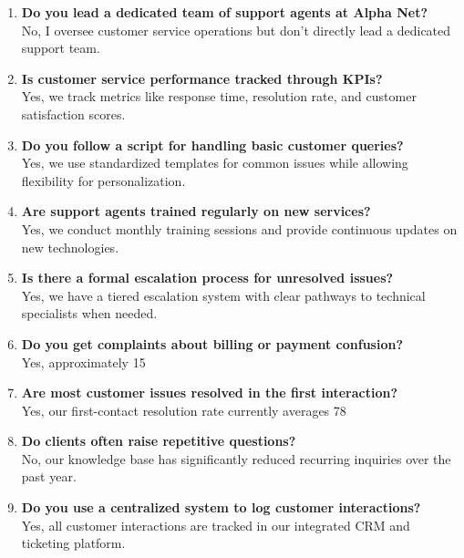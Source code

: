 \begin{enumerate}
    \item \textbf{Do you lead a dedicated team of support agents at Alpha Net?}\\
    No, I oversee customer service operations but don't directly lead a dedicated support team.
    
    \item \textbf{Is customer service performance tracked through KPIs?}\\
    Yes, we track metrics like response time, resolution rate, and customer satisfaction scores.
    
    \item \textbf{Do you follow a script for handling basic customer queries?}\\
    Yes, we use standardized templates for common issues while allowing flexibility for personalization.
    
    \item \textbf{Are support agents trained regularly on new services?}\\
    Yes, we conduct monthly training sessions and provide continuous updates on new technologies.
    
    \item \textbf{Is there a formal escalation process for unresolved issues?}\\
    Yes, we have a tiered escalation system with clear pathways to technical specialists when needed.
    
    \item \textbf{Do you get complaints about billing or payment confusion?}\\
    Yes, approximately 15%
    
    \item \textbf{Are most customer issues resolved in the first interaction?}\\
    Yes, our first-contact resolution rate currently averages 78%
    
    \item \textbf{Do clients often raise repetitive questions?}\\
    No, our knowledge base has significantly reduced recurring inquiries over the past year.
    
    \item \textbf{Do you use a centralized system to log customer interactions?}\\
    Yes, all customer interactions are tracked in our integrated CRM and ticketing platform.
    

\end{enumerate}
